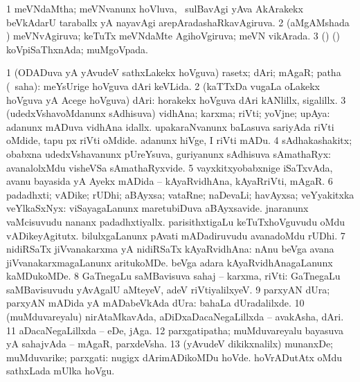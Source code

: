 {\bentry
{} 
\gl{\gu}
\bmng
\bnum
\num{1} meVNdaMtha; meVNvanunx hoVluva, \kanmu\ sulBavAgi yAva AkArakekx beVkAdarU taraballx yA nayavAgi arepAradashaRkavAgiruva. 
\num{2} (aMgAMshada \vi) meVNvAgiruva; keTuTx meVNdaMte AgihoVgiruva; meVN vikArada. 
\num{3} (\birx) (\ashi) koVpiSaThxnAda; muMgoVpada. 
\enum
\emng
\eentry

\bentry
{} 
\gl{\nA}
\expl{}
\bmng
\bnum
\num{1} (ODADuva yA yAvudeV sathxLakekx hoVguva) rasetx; dAri; mAgaR; patha (\rUpa\ saha):  meYsUrige hoVguva dAri keVLida. 
\num{2} (kaTTxDa \mo vugaLa oLakekx hoVguva yA Acege hoVguva) dAri:  horakekx hoVguva dAri kANlillx, sigalillx. 
\num{3} (udedxVshavoMdanunx sAdhisuva) vidhAna; karxma; riVti; yoVjne; upAya:  adanunx mADuva vidhAna idallx.  upakaraNvanunx baLasuva sariyAda riVti oMdide, tapu px riVti oMdide.  adanunx hiVge, I riVti mADu. 
\num{4} sAdhakashakitx; obabxna udedxVshavanunx pUreYsuva, guriyanunx sAdhisuva sAmathaRyx:  avanalolxMdu visheVSa sAmathaRyxvide. 
\num{5} vayxkitxyobabxnige iSaTxvAda, avanu bayasida yA Ayekx mADida -- kAyaRvidhAna, kAyaRriVti, mAgaR. 
\num{6} padadhxti; vADike; rUDhi; aBAyxsa; vataRne; naDevaLi; havAyxsa; veYyakitxka veYlkaSxNyx:  viSayagaLanunx maretubiDuva aBAyxsavide.  jnaranunx vaMcisuvudu nananx padadhxtiyallx.  parisithxtigaLu keTuTxhoVguvudu oMdu vADikeyAgitutx.  bilulxgaLanunx pAvati mADadiruvudu avanadoMdu rUDhi. 
\num{7} nidiRSaTx jiVvanakarxma yA nidiRSaTx kAyaRvidhAna:  nAnu beVga avana jiVvanakarxmagaLanunx aritukoMDe.  beVga adara kAyaRvidhAnagaLanunx kaMDukoMDe. 
\num{8} GaTnegaLu saMBavisuva sahaj -- karxma, riVti:  GaTnegaLu saMBavisuvudu yAvAgalU aMteyeV, adeV riVtiyalilxyeV. 
\num{9} parxyAN dUra; parxyAN mADida yA mADabeVkAda dUra:  bahaLa dUradalilxde. 
\num{10} (muMduvareyalu) nirAtaMkavAda, aDiDxaDacaNegaLillxda -- avakAsha, dAri. 
\num{11} aDacaNegaLillxda -- eDe, jAga. 
\num{12} parxgatipatha; muMduvareyalu bayasuva yA sahajvAda -- mAgaR, parxdeVsha. 
\num{13} (yAvudeV dikikxnalilx) munanxDe; muMduvarike; parxgati:  nugigx dArimADikoMDu hoVde.  hoVrADutAtx oMdu sathxLada mUlka hoVgu. 
}
